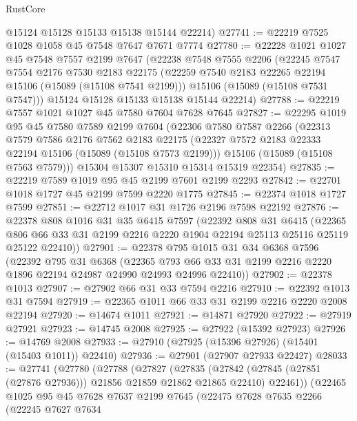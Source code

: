 \begin{lexlean}{RustCore}
\begin{coremodule}
      @15124
      @15128
      @15133
      @15138
      @15144
      @22214)
@27741 := @22219 @7525 @1028 @1058 @45 @7548 @7647 @7671 @7774
@27780 := @22228
    @1021
    @1027
    @45
    @7548
    @7557
    @2199
    @7647
    (@22238
      @7548
      @7555
      @2206
      (@22245
        @7547
        @7554
        @2176
        @7530
        @2183
        @22175
        (@22259 @7540 @2183 @22265 @22194 @15106 (@15089 (@15108 @7541 @2199)))
        @15106
        (@15089 (@15108 @7531 @7547)))
      @15124
      @15128
      @15133
      @15138
      @15144
      @22214)
@27788 := @22219 @7557 @1021 @1027 @45 @7580 @7604 @7628 @7645
@27827 := @22295
    @1019
    @95
    @45
    @7580
    @7589
    @2199
    @7604
    (@22306
      @7580
      @7587
      @2266
      (@22313
        @7579
        @7586
        @2176
        @7562
        @2183
        @22175
        (@22327 @7572 @2183 @22333 @22194 @15106 (@15089 (@15108 @7573 @2199)))
        @15106
        (@15089 (@15108 @7563 @7579)))
      @15304
      @15307
      @15310
      @15314
      @15319
      @22354)
@27835 := @22219 @7589 @1019 @95 @45 @2199 @7601 @2199 @2293
@27842 := @22701 @1018 @1727 @45 @2199 @7599 @2220 @1775
@27845 := @22374 @1018 @1727 @7599
@27851 := @22712 @1017 @31 @1726 @2196 @7598 @22192
@27876 := @22378
    @808
    @1016
    @31
    @35
    @6415
    @7597
    (@22392
      @808
      @31
      @6415
      (@22365 @806 @66 @33 @31 @2199 @2216 @2220 @1904 @22194 @25113 @25116 @25119 @25122 @22410))
@27901 := @22378
    @795
    @1015
    @31
    @34
    @6368
    @7596
    (@22392
      @795
      @31
      @6368
      (@22365 @793 @66 @33 @31 @2199 @2216 @2220 @1896 @22194 @24987 @24990 @24993 @24996 @22410))
@27902 := @22378 @1013
@27907 := @27902 @66 @31 @33 @7594 @2216
@27910 := @22392 @1013 @31 @7594
@27919 := @22365 @1011 @66 @33 @31 @2199 @2216 @2220 @2008 @22194
@27920 := @14674 @1011
@27921 := @14871 @27920
@27922 := @27919 @27921
@27923 := @14745 @2008
@27925 := @27922 (@15392 @27923)
@27926 := @14769 @2008
@27933 := @27910 (@27925 (@15396 @27926) (@15401 (@15403 @1011)) @22410)
@27936 := @27901 (@27907 @27933 @22427)
@28033 := @27741
    (@27780
      (@27788
        (@27827
          (@27835
            (@27842 (@27845 (@27851 (@27876 @27936))) @21856 @21859 @21862 @21865 @22410)
            @22461))
        (@22465
          @1025
          @95
          @45
          @7628
          @7637
          @2199
          @7645
          (@22475
            @7628
            @7635
            @2266
            (@22245
              @7627
              @7634

\end{coremodule}
\end{lexlean}
